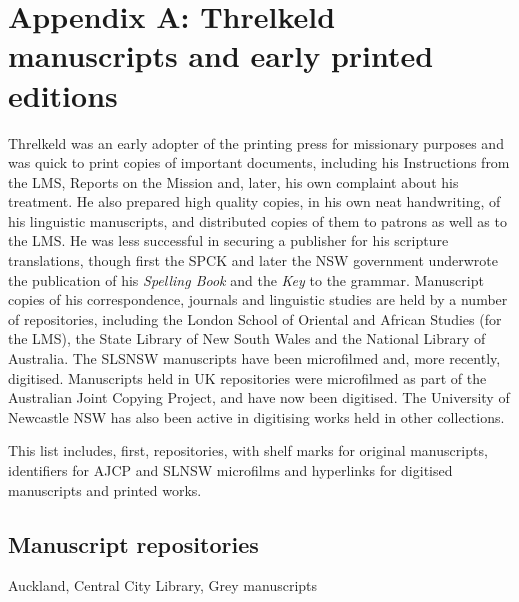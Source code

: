 \chapter*{Appendix A: Threlkeld manuscripts and early printed editions}
\label{Appendix_A}

Threlkeld was an early adopter of the printing press for missionary purposes and was quick to print copies of important documents, including his Instructions from the LMS, Reports on the Mission and, later, his own complaint about his treatment. He also prepared high quality copies, in his own neat handwriting, of his linguistic manuscripts, and distributed copies of them to patrons as well as to the LMS. He was less successful in securing a publisher for his scripture translations, though first the SPCK and later the NSW government underwrote the publication of his \textit{Spelling Book} and the \textit{Key} to the grammar. Manuscript copies of his correspondence, journals and linguistic studies are held by a number of repositories, including the London School of Oriental and African Studies (for the LMS), the State Library of New South Wales and the National Library of Australia. The SLSNSW manuscripts have been microfilmed and, more recently, digitised. Manuscripts held in UK repositories were microfilmed as part of the Australian Joint Copying Project, and have now been digitised. The University of Newcastle NSW has also been active in digitising works held in other collections.

This list includes, first, repositories, with shelf marks for original manuscripts, identifiers for AJCP and SLNSW microfilms and hyperlinks for digitised manu\-scripts and printed works.

\section*{Manuscript repositories}

Auckland, Central City Library, Grey manuscripts

